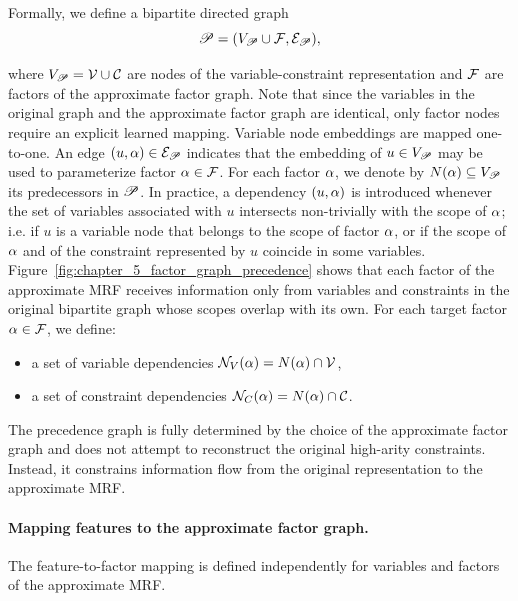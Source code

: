 Formally, we define a bipartite directed graph
\begin{equation*}
\mathscr{P} = (V_{\mathscr{P}} \cup \mathcal{F}, \mathcal{E}_{\mathscr{P}}),
\end{equation*}

where $V_{\mathscr{P}} = \mathcal{V} \cup \mathcal{C}$ are nodes of the variable-constraint representation and $\mathcal{F}$ are factors of the approximate factor graph. Note that since the variables in the original graph and the approximate factor graph are identical, only factor nodes require an explicit learned mapping. Variable node embeddings are mapped one-to-one. An edge $(u, \alpha) \in \mathcal{E}_{\mathscr{P}}$ indicates that the embedding of $u \in V_{\mathscr{P}}$ may be used to parameterize factor $\alpha \in \mathcal{F}$. For each factor $\alpha$, we denote by $N(\alpha) \subseteq V_{\mathscr{P}}$ its predecessors in $\mathscr{P}$. In practice, a dependency $(u,\alpha)$ is introduced whenever the set of variables associated with $u$ intersects non-trivially with the scope of $\alpha$; i.e. if $u$ is a variable node that belongs to the scope of factor $\alpha$, or if the scope of $\alpha$ and of the constraint represented by $u$ coincide in some variables. Figure~\ref{fig:chapter_5_factor_graph_precedence} shows that each factor of the approximate MRF receives information only from variables and constraints in the original bipartite graph whose scopes overlap with its own. For each target factor
$\alpha \in \mathcal{F}$, we define:
\begin{itemize}
    \item a set of variable dependencies $\mathcal N_V(\alpha) = N(\alpha) \cap \mathcal{V}$,
    \item a set of constraint dependencies $\mathcal N_C(\alpha) = N(\alpha) \cap \mathcal{C}$.
\end{itemize}



The precedence graph is fully determined by the choice of the approximate factor graph and does not attempt to reconstruct the original high-arity constraints. Instead, it constrains information flow from the original representation to the approximate MRF.

\paragraph{Mapping features to the approximate factor graph.}
\label{sec:feature_factor_mapping}
The feature-to-factor mapping is defined independently for variables and factors of the approximate MRF.

